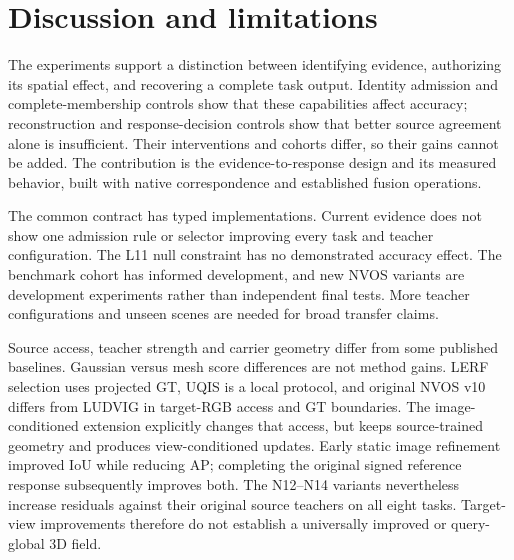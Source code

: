 \section{Discussion and limitations}
The experiments support a distinction between identifying evidence, authorizing
its spatial effect, and recovering a complete task output. Identity admission
and complete-membership controls show that these capabilities affect accuracy;
reconstruction and response-decision controls show that better source agreement
alone is insufficient. Their interventions and cohorts differ, so their gains
cannot be added. The contribution is the evidence-to-response design and its
measured behavior, built with native correspondence and established fusion
operations.

The common contract has typed implementations. Current evidence does not show
one admission rule or selector improving every task and teacher configuration.
The L11 null constraint has no demonstrated accuracy effect. The benchmark
cohort has informed development, and new NVOS variants are development
experiments rather than independent final tests. More teacher configurations
and unseen scenes are needed for broad transfer claims.

Source access, teacher strength and carrier geometry differ from some published
baselines. Gaussian versus mesh score differences are not method gains. LERF
selection uses projected GT, UQIS is a local protocol, and original NVOS v10 differs from
LUDVIG in target-RGB access and GT boundaries. The image-conditioned extension
explicitly changes that access, but keeps source-trained geometry and produces
view-conditioned updates. Early static image refinement improved IoU while
reducing AP; completing the original signed reference response subsequently
improves both. The N12--N14 variants nevertheless increase residuals against
their original source teachers on all eight tasks. Target-view improvements therefore
do not establish a universally improved or query-global 3D field.


